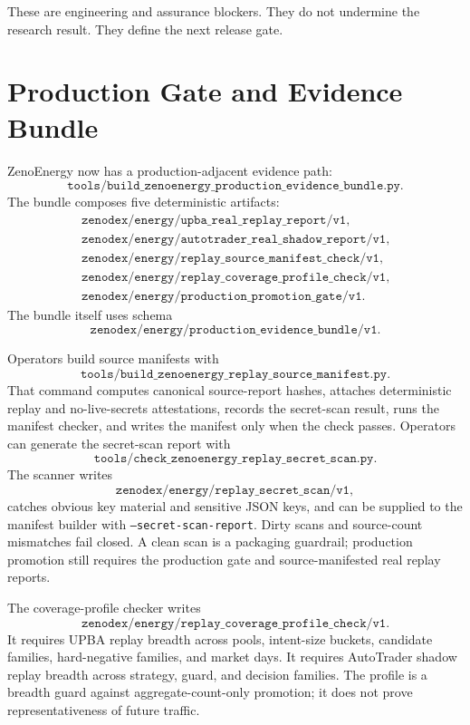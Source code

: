 \documentclass[11pt]{article}
\begin{document}
These are engineering and assurance blockers. They do not undermine the
research result. They define the next release gate.

\section{Production Gate and Evidence Bundle}

ZenoEnergy now has a production-adjacent evidence path:
\[
  \texttt{tools/build\_zenoenergy\_production\_evidence\_bundle.py}.
\]
The bundle composes five deterministic artifacts:
\[
\begin{array}{l}
\texttt{zenodex/energy/upba\_real\_replay\_report/v1},\\
\texttt{zenodex/energy/autotrader\_real\_shadow\_report/v1},\\
\texttt{zenodex/energy/replay\_source\_manifest\_check/v1},\\
\texttt{zenodex/energy/replay\_coverage\_profile\_check/v1},\\
\texttt{zenodex/energy/production\_promotion\_gate/v1}.
\end{array}
\]
The bundle itself uses schema
\[
  \texttt{zenodex/energy/production\_evidence\_bundle/v1}.
\]

Operators build source manifests with
\[
  \texttt{tools/build\_zenoenergy\_replay\_source\_manifest.py}.
\]
That command computes canonical source-report hashes, attaches deterministic
replay and no-live-secrets attestations, records the secret-scan result, runs
the manifest checker, and writes the manifest only when the check passes.
Operators can generate the secret-scan report with
\[
  \texttt{tools/check\_zenoenergy\_replay\_secret\_scan.py}.
\]
The scanner writes
\[
  \texttt{zenodex/energy/replay\_secret\_scan/v1},
\]
catches obvious key material and sensitive JSON keys, and can be supplied to the
manifest builder with \texttt{--secret-scan-report}. Dirty scans and
source-count mismatches fail closed. A clean scan is a packaging guardrail;
production promotion still requires the production gate and source-manifested
real replay reports.

The coverage-profile checker writes
\[
  \texttt{zenodex/energy/replay\_coverage\_profile\_check/v1}.
\]
It requires UPBA replay breadth across pools, intent-size buckets, candidate
families, hard-negative families, and market days. It requires AutoTrader
shadow replay breadth across strategy, guard, and decision families. The profile
is a breadth guard against aggregate-count-only promotion; it does not prove
representativeness of future traffic.
\end{document}
